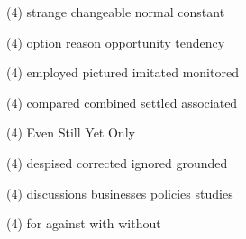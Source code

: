 \item
\begin{tasks}(4)
	\task strange
	\task changeable
	\task normal
	\task constant
\end{tasks}
\item
\begin{tasks}(4)
	\task option
	\task reason
	\task opportunity
	\task tendency
\end{tasks}
\item
\begin{tasks}(4)
	\task employed
	\task pictured
	\task imitated
	\task monitored
\end{tasks}
\item
\begin{tasks}(4)
	\task compared
	\task combined
	\task settled
	\task associated
\end{tasks}
\item
\begin{tasks}(4)
	\task Even
	\task Still
	\task Yet
	\task Only
\end{tasks}
\item
\begin{tasks}(4)
	\task despised
	\task corrected
	\task ignored
	\task grounded
\end{tasks}
\item
\begin{tasks}(4)
	\task discussions
	\task businesses
	\task policies
	\task studies
\end{tasks}
\item
\begin{tasks}(4)
	\task for
	\task against
	\task with
	\task without
\end{tasks}
